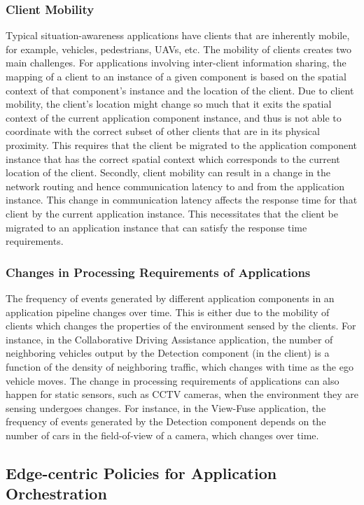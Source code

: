 \subsubsection{Client Mobility}
Typical situation-awareness applications have clients that are inherently mobile, for example, vehicles, pedestrians, UAVs, etc. The mobility of clients creates two main challenges. For applications involving inter-client information sharing, the mapping of a client to an instance of a given component is based on the spatial context of that component's instance and the location of the client. Due to client mobility, the client's location might change so much that it exits the spatial context of the current application component instance, and thus is not able to coordinate with the correct subset of other clients that are in its physical proximity. This requires that the client be migrated to the application component instance that has the correct spatial context which corresponds to the current location of the client. Secondly, client mobility can result in a change in the network routing and hence communication latency to and from the application instance. This change in communication latency affects the response time for that client by the current application instance. This necessitates that the client be migrated to an application instance that can satisfy the response time requirements.

\subsubsection{Changes in Processing Requirements of Applications}
The frequency of events generated by different application components in an application pipeline changes over time. This is either due to the mobility of clients which changes the properties of the environment sensed by the clients. For instance, in the Collaborative Driving Assistance application, the number of neighboring vehicles output by the Detection component (in the client) is a function of the density of neighboring traffic, which changes with time as the ego vehicle moves. The change in processing requirements of applications can also happen for static sensors, such as CCTV cameras, when the environment they are sensing undergoes changes. For instance, in the View-Fuse application, the frequency of events generated by the Detection component depends on the number of cars in the field-of-view of a camera, which changes over time.

\subsection{Edge-centric Policies for Application Orchestration}


